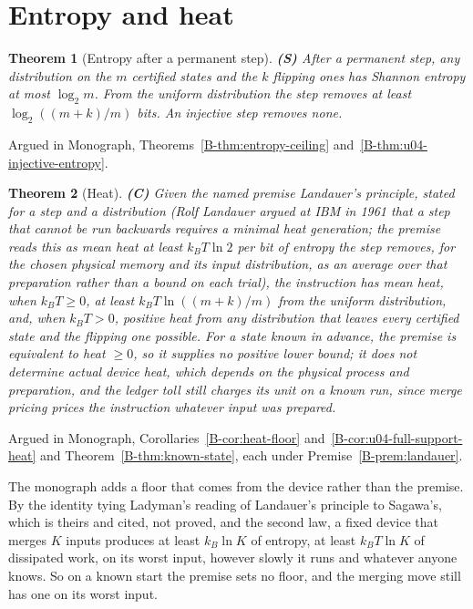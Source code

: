 \documentclass[11pt, a4paper]{report}
\theoremstyle{definition}
\theoremstyle{plain}
\newtheorem{theorem}{Theorem}[chapter]
\begin{document}
\section{Entropy and heat}

\begin{theorem}[Entropy after a permanent step] \textbf{(S)}
After a permanent step, any distribution on the $m$ certified states and the $k$ flipping ones has Shannon entropy at most $\log_2 m$. From the uniform distribution the step removes at least $\log_2((m+k)/m)$ bits. An injective step removes none.
\end{theorem}
\noindent Argued in Monograph, Theorems~\ref{B-thm:entropy-ceiling} and~\ref{B-thm:u04-injective-entropy}.

\begin{theorem}[Heat] \textbf{(C)}
Given the named premise Landauer's principle, stated for a step and a distribution (Rolf Landauer argued at IBM in 1961 that a step that cannot be run backwards requires a minimal heat generation; the premise reads this as mean heat at least $k_B T \ln 2$ per bit of entropy the step removes, for the chosen physical memory and its input distribution, as an average over that preparation rather than a bound on each trial), the instruction has mean heat, when $k_B T \ge 0$, at least $k_B T \ln((m+k)/m)$ from the uniform distribution, and, when $k_B T > 0$, positive heat from any distribution that leaves every certified state and the flipping one possible. For a state known in advance, the premise is equivalent to heat $\ge 0$, so it supplies no positive lower bound; it does not determine actual device heat, which depends on the physical process and preparation, and the ledger toll still charges its unit on a known run, since merge pricing prices the instruction whatever input was prepared.
\end{theorem}
\noindent Argued in Monograph, Corollaries~\ref{B-cor:heat-floor} and~\ref{B-cor:u04-full-support-heat} and
Theorem~\ref{B-thm:known-state}, each under Premise~\ref{B-prem:landauer}.

The monograph adds a floor that comes from the device rather than the premise. By the identity tying Ladyman's reading of Landauer's principle to Sagawa's, which is theirs and cited, not proved, and the second law, a fixed device that merges $K$ inputs produces at least $k_B\ln K$ of entropy, at least $k_B T\ln K$ of dissipated work, on its worst input, however slowly it runs and whatever anyone knows. So on a known start the premise sets no floor, and the merging move still has one on its worst input.
\end{document}
